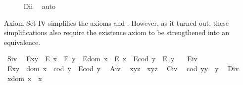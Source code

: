 \begin{isabellebody}
%
\isadelimproof
\ \ \ \ %
\endisadelimproof
%
\isatagproof
{}\isamarkupfalse%
\ D\isactrlsub i\isactrlsub i\ \isamarkupfalse%
\ auto%
\endisatagproof
{\isafoldproof}%
%
\isadelimproof
%
\endisadelimproof
%
\isamarkuptrue%
%
\begin{isamarkuptext}%
Axiom Set IV simplifies the axioms  and  . However, as it turned 
 out, these simplifications also require the existence axiom  to be strengthened into
 an equivalence.%
\end{isamarkuptext}\isamarkuptrue%
\ S\isactrlsub i\isactrlsub v{\isacharcolon}\ %
\ {\isachardoublequoteopen}{\isacharparenleft}E{\isacharparenleft}x{\isasymcdot}y{\isacharparenright}\ \isactrlbold {\isasymrightarrow}\ {\isacharparenleft}E\ x\ \isactrlbold {\isasymand}\ E\ y{\isacharparenright}{\isacharparenright}\ \isactrlbold {\isasymand}\ {\isacharparenleft}E{\isacharparenleft}dom\ x{\isacharparenright}\ \isactrlbold {\isasymrightarrow}\ E\ x{\isacharparenright}\ \isactrlbold {\isasymand}\ {\isacharparenleft}E{\isacharparenleft}cod\ y{\isacharparenright}\ \isactrlbold {\isasymrightarrow}\ E\ y{\isacharparenright}{\isachardoublequoteclose}\ \ \isanewline
\ E\isactrlsub i\isactrlsub v{\isacharcolon}\ %
\ {\isachardoublequoteopen}E{\isacharparenleft}x{\isasymcdot}y{\isacharparenright}\ \isactrlbold {\isasymleftrightarrow}\ {\isacharparenleft}dom\ x\ {\isasymcong}\ cod\ y\ \isactrlbold {\isasymand}\ E{\isacharparenleft}cod\ y{\isacharparenright}{\isacharparenright}{\isachardoublequoteclose}\ \isanewline
\ A\isactrlsub i\isactrlsub v{\isacharcolon}\ %
\ {\isachardoublequoteopen}x{\isasymcdot}{\isacharparenleft}y{\isasymcdot}z{\isacharparenright}\ {\isasymcong}\ {\isacharparenleft}x{\isasymcdot}y{\isacharparenright}{\isasymcdot}z{\isachardoublequoteclose}\ \isanewline
\ C\isactrlsub i\isactrlsub v{\isacharcolon}\ %
\ {\isachardoublequoteopen}{\isacharparenleft}cod\ y{\isacharparenright}{\isasymcdot}y\ {\isasymcong}\ y{\isachardoublequoteclose}\ \isanewline
\ D\isactrlsub i\isactrlsub v{\isacharcolon}\ %
\ {\isachardoublequoteopen}x{\isasymcdot}{\isacharparenleft}dom\ x{\isacharparenright}\ {\isasymcong}\ x{\isachardoublequoteclose}%

\end{isabellebody}
